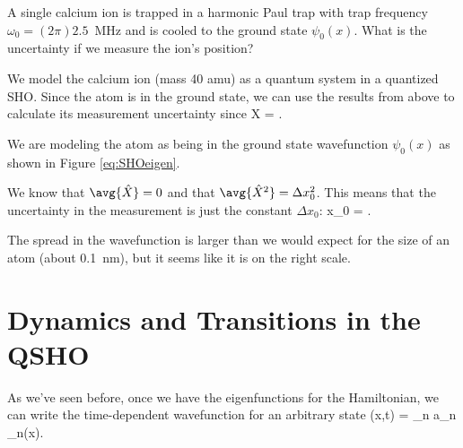\begin{example}
\label{ex:trappedca}
A single calcium ion is trapped in a harmonic Paul trap with trap frequency $\omega_0 = (2\pi) 2.5$~MHz and is cooled to the ground state $\psi_0(x)$. What is the uncertainty if we measure the ion's position?

\model We model the calcium ion (mass 40 amu) as a quantum system in a quantized SHO. Since the atom is in the ground state, we can use the results from above to calculate its measurement uncertainty since
\beq
\Delta X = .
\eeq

\vis We are modeling the atom as being in the ground state wavefunction $\psi_0(x)$ as shown in Figure \ref{eq:SHOeigen}.

\sol We know that $\avg{\hat{X}}=0$ and that $\avg{\hat{X}^2}=\Delta x_0^2$. This means that the uncertainty in the measurement is just the constant $\Delta x_0$:
\beq
\Delta x_0 =  .
\eeq

\assess The spread in the wavefunction is larger than we would expect for the size of an atom (about 0.1~nm), but it seems like it is on the right scale.

\end{example}

\section{Dynamics and Transitions in the QSHO}
\label{sec:qshodynamics}
As we've seen before, once we have the eigenfunctions for the Hamiltonian, we can write the time-dependent wavefunction for an arbitrary state
\beq
\psi(x,t) = \sum_n a_n  \psi_n(x).
\eeq

